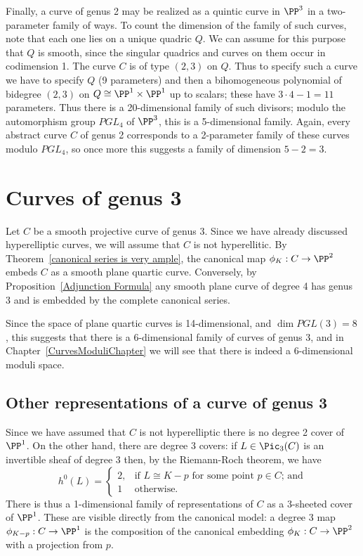 Finally, a curve of genus 2 may be realized as a quintic curve in $\PP^3$ in a two-parameter family of ways. To count the dimension of the family of such curves, note that each one lies on a unique quadric $Q$. We can assume for this purpose that $Q$ is smooth, since the singular quadrics and curves on them occur in codimension 1. The curve $C$ is of type $(2,3)$ on $Q$. Thus to specify such a curve we have to specify $Q$ (9 parameters) and then a bihomogeneous polynomial of bidegree $(2,3)$ on $Q \cong \PP^1 \times \PP^1$ up to scalars; these have $3\cdot 4 - 1 = 11$ parameters. Thus there is a 20-dimensional family of such divisors; modulo the automorphism group $PGL_4$ of $\PP^3$, this is a 5-dimensional family. Again, every abstract curve $C$ of genus 2 corresponds to a 2-parameter family of these curves modulo $PGL_4$, so once more this suggests a family of dimension $ 5 - 2 = 3$.

\section{Curves of genus 3}

Let $C$ be a smooth projective curve of genus 3. Since we have already discussed hyperelliptic curves, 
we will assume  that $C$ is not hyperellitic. By  Theorem~\ref{canonical series is very ample}, the canonical map $\phi_K : C \to \PP^2$ embeds $C$ as a smooth plane quartic curve. Conversely, by Proposition~\ref{Adjunction Formula} any smooth plane curve of degree 4 has genus 3 and is embedded by the complete canonical series. 


Since the space of plane quartic curves is 14-dimensional, and $\dim PGL(3) = 8$, this suggests that
there is a 6-dimensional family of curves of genus 3, and in Chapter~\ref{CurvesModuliChapter}
we will see that there is indeed a 6-dimensional moduli space.

\subsection{Other representations of a curve of genus 3}\label{other genus 3}
Since we have assumed that $C$ is not hyperelliptic there is no degree 2 cover of $\PP^1$. On the other hand, there are degree 3 covers: if $L \in \Pic_3(C)$ is an invertible sheaf of degree 3 then, by the Riemann-Roch theorem, we have
$$
h^0(L) = 
\begin{cases}
2, &\text{if $L \cong K-p$ for some point $p \in C$; and} \\
1 &\text{otherwise.}
\end{cases}
$$
There is thus a 1-dimensional family of representations of $C$ as a 3-sheeted cover of $\PP^1$. These are  visible directly from the canonical model: a degree 3 map $\phi_{K-p} : C \to \PP^1$ is the composition of the canonical embedding $\phi_K : C \to \PP^2$ with a projection from $p$. 

